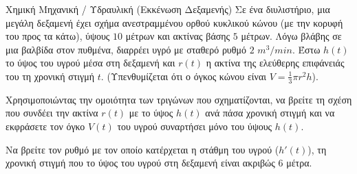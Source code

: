 \begin{problhma}{Χημική Μηχανική / Υδραυλική (Εκκένωση Δεξαμενής)}
Σε ένα διυλιστήριο, μια μεγάλη δεξαμενή έχει σχήμα ανεστραμμένου ορθού κυκλικού κώνου (με την κορυφή του προς τα κάτω), ύψους $10$ μέτρων και ακτίνας βάσης $5$ μέτρων. Λόγω βλάβης σε μια βαλβίδα στον πυθμένα, διαρρέει υγρό με σταθερό ρυθμό $2$ $\si{m^3/min}$.
Έστω $h(t)$ το ύψος του υγρού μέσα στη δεξαμενή και $r(t)$ η ακτίνα της ελεύθερης επιφάνειάς του τη χρονική στιγμή $t$. (Υπενθυμίζεται ότι ο όγκος κώνου είναι $V = \frac{1}{3}\pi r^2 h$).
\begin{alist}
\item Χρησιμοποιώντας την ομοιότητα των τριγώνων που σχηματίζονται, να βρείτε τη σχέση που συνδέει την ακτίνα $r(t)$ με το ύψος $h(t)$ ανά πάσα χρονική στιγμή και να εκφράσετε τον όγκο $V(t)$ του υγρού συναρτήσει μόνο του ύψους $h(t)$.
\item Να βρείτε τον ρυθμό με τον οποίο κατέρχεται η στάθμη του υγρού ($h'(t)$), τη χρονική στιγμή που το ύψος του υγρού στη δεξαμενή είναι ακριβώς $6$ μέτρα.
\end{alist}

\begin{center}
\end{center}
\end{problhma}
